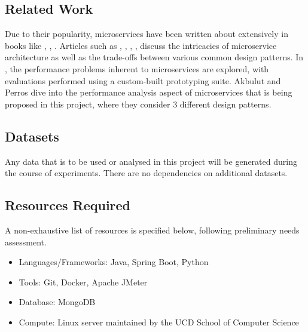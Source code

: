 \subsection{Related Work}
Due to their popularity, microservices have been written about extensively in books like \cite{richardson18}, \cite{kleppmann17}, \cite{newman14}. Articles such as \cite{md19}, \cite{md20}, \cite{sahiti20}, \cite{udantha19}, \cite{lewis14} discuss the intricacies of microservice architecture as well as the trade-offs between various common design patterns. In \cite{cully20}, the performance problems inherent to microservices are explored, with evaluations performed using a custom-built prototyping suite. Akbulut and Perros \cite{akbulut19} dive into the performance analysis aspect of microservices that is being proposed in this project, where they consider 3 different design patterns.

\subsection{Datasets}
Any data that is to be used or analysed in this project will be generated during the course of experiments. There are no dependencies on additional datasets.

\subsection{Resources Required}
A non-exhaustive list of resources is specified below, following preliminary needs assessment.

\begin{itemize}
	\item Languages/Frameworks: Java, Spring Boot, Python
	\item Tools: Git, Docker, Apache JMeter
	\item Database: MongoDB
	\item Compute: Linux server maintained by the UCD School of Computer Science
\end{itemize}


